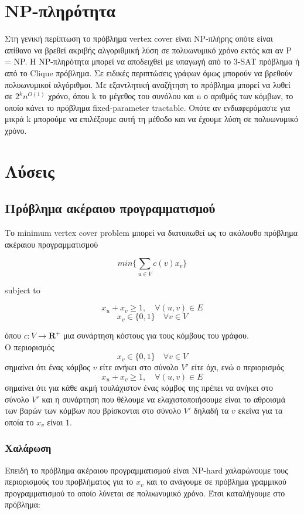 \section{NP-πληρότητα}

Στη γενική περίπτωση το πρόβλημα vertex cover είναι NP-πλήρης οπότε είναι απίθανο να βρεθεί ακριβής αλγοριθμική λύση σε πολυωνυμικό χρόνο εκτός και αν P = NP. H NP-πληρότητα μπορεί να αποδειχθεί με υπαγωγή από το 3-SAT πρόβλημα ή από το Clique πρόβλημα. Σε ειδικές περιπτώσεις γράφων όμως μπορούν να βρεθούν πολυωνυμικοί αλγόριθμοι. Με εξαντλητική αναζήτηση το πρόβλημα μπορεί να λυθεί σε $2^{k}n^{O(1)}$ χρόνο, όπου k το μέγεθος του συνόλου και n ο αριθμός των κόμβων, το οποίο κάνει το πρόβλημα fixed-parameter tractable. Οπότε αν ενδιαφερόμαστε για μικρά k μπορούμε να επιλέξουμε αυτή τη μέθοδο και να έχουμε λύση σε πολυωνυμικό χρόνο.

\section{Λύσεις}

\subsection{Πρόβλημα ακέραιου προγραμματισμού}

Το minimum vertex cover problem μπορεί να διατυπωθεί ως το ακόλουθο πρόβλημα ακέραιου προγραμματισμού

$$min\{\displaystyle\sum_{u\in{V}} c(v)x_v\}$$ 
\centerline{subject to}
$$x_u + x_v \geq{1}, \quad \forall (u, v) \in{E}$$
$$ x_v \in{\{0, 1\}} \quad \forall v \in{V}$$

όπου $c : V \rightarrow {\boldsymbol{R}^+}$ μια συνάρτηση κόστους για τους κόμβους του γράφου.\\
Ο περιορισμός $$ x_v \in{\{0, 1\}} \quad \forall v \in{V}$$ σημαίνει ότι ένας κόμβος $v$ είτε ανήκει στο σύνολο $V'$ είτε όχι,
ενώ ο περιορισμός $$x_u + x_v \geq{1}, \quad \forall (u, v) \in{E}$$ σημαίνει ότι για κάθε ακμή τουλάχιστον ένας κόμβος της πρέπει να ανήκει στο σύνολο $V'$
και η συνάρτηση που θέλουμε να ελαχιστοποιήσουμε είναι το αθροισμά των βαρών των κόμβων που βρίσκονται στο σύνολο $V'$ δηλαδή τα $v$ εκείνα για τα οποία το $x_v$ είναι $1$.

\subsubsection{Χαλάρωση}

Επειδή το πρόβλημα ακέραιου προγραμματισμού είναι NP-hard χαλαρώνουμε τους περιορισμούς του προβλήματος για το $x_v$ και το ανάγουμε σε πρόβλημα γραμμικού προγραμματισμού το οποίο λύνεται σε πολυωνυμικό χρόνο. Έτσι καταλήγουμε στο πρόβλημα:

